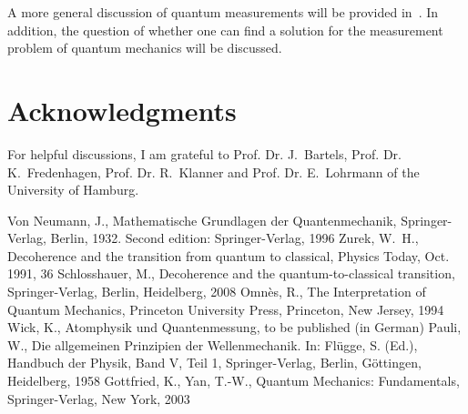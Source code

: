 \documentclass[11pt,a4paper]{article}
\begin{document}
A more general discussion of quantum measurements will be provided in~\cite{Wick}.  In addition, the question of whether one can find a solution for the measurement problem of quantum mechanics will be discussed.  \\


\section*{Acknowledgments}

For helpful discussions, I am grateful to Prof. Dr. J.~Bar\-tels, 
Prof. Dr. K.~Fre\-den\-hagen, Prof. Dr. R.~Klan\-ner and 
Prof. Dr. E.~Lohr\-mann of the University of Hamburg.  


\begin{thebibliography}{9999}

 Von Neumann, J., Mathematische Grundlagen der Quan\-ten\-mecha\-nik, Sprin\-ger-Ver\-lag, Berlin, 1932. Second edition: Sprin\-ger-Ver\-lag, 1996  
%
 Zurek, W.~H., Decoherence and the transition from quantum to classical, Physics Today, Oct. 1991, 36 
%
 Schlosshauer, M., Decoherence and the quantum-to-classical transition, Sprin\-ger-Ver\-lag, Ber\-lin, Heidel\-berg, 2008  
%
 Omn\`es, R., The Interpretation of Quantum Mechanics, Princeton University Press, Princeton, New Jersey, 1994  
%
 Wick, K., Atom\-physik und Quanten\-messung, to be published (in German)  
%
 Pauli, W., Die allgemeinen Prinzipien der Wellen\-mechanik. In: Fl\"ug\-ge, S. (Ed.), Hand\-buch der Phy\-sik, Band V, Teil 1, Sprin\-ger-Ver\-lag, Berlin, G\"ot\-tin\-gen, Heidel\-berg, 1958  
%
 Gottfried, K., Yan, T.-W., Quantum Mechanics: Fundamentals, Springer-Verlag, New York, 2003 
%
\end{thebibliography} 
\end{document}
